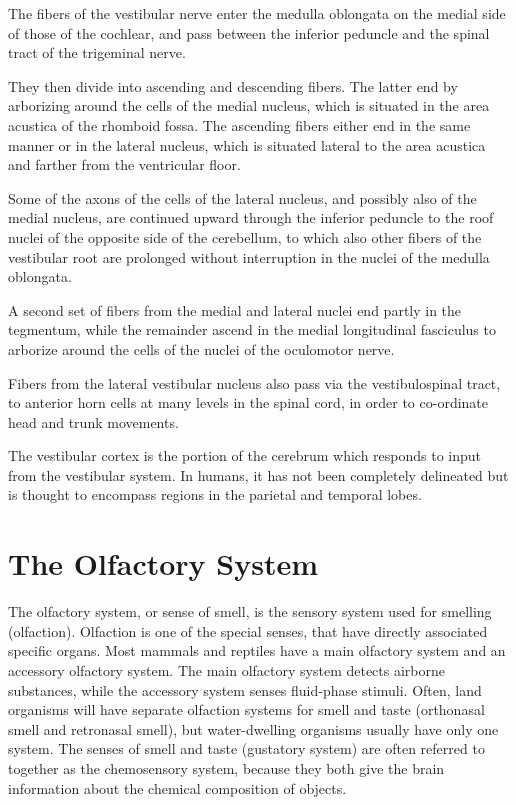 The fibers of the vestibular nerve enter the medulla oblongata on the medial side of those of the cochlear, and pass between the inferior peduncle and the spinal tract of the trigeminal nerve.

They then divide into ascending and descending fibers. The latter end by arborizing around the cells of the medial nucleus, which is situated in the area acustica of the rhomboid fossa. The ascending fibers either end in the same manner or in the lateral nucleus, which is situated lateral to the area acustica and farther from the ventricular floor.

Some of the axons of the cells of the lateral nucleus, and possibly also of the medial nucleus, are continued upward through the inferior peduncle to the roof nuclei of the opposite side of the cerebellum, to which also other fibers of the vestibular root are prolonged without interruption in the nuclei of the medulla oblongata.

A second set of fibers from the medial and lateral nuclei end partly in the tegmentum, while the remainder ascend in the medial longitudinal fasciculus to arborize around the cells of the nuclei of the oculomotor nerve.

Fibers from the lateral vestibular nucleus also pass via the vestibulospinal tract, to anterior horn cells at many levels in the spinal cord, in order to co-ordinate head and trunk movements.

The vestibular cortex is the portion of the cerebrum which responds to input from the vestibular system. In humans, it has not been completely delineated but is thought to encompass regions in the parietal and temporal lobes.

\hypertarget{the-olfactory-system}{%
\chapter{The Olfactory System}\label{the-olfactory-system}}

The olfactory system, or sense of smell, is the sensory system used for smelling (olfaction). Olfaction is one of the special senses, that have directly associated specific organs. Most mammals and reptiles have a main olfactory system and an accessory olfactory system. The main olfactory system detects airborne substances, while the accessory system senses fluid-phase stimuli. Often, land organisms will have separate olfaction systems for smell and taste (orthonasal smell and retronasal smell), but water-dwelling organisms usually have only one system. The senses of smell and taste (gustatory system) are often referred to together as the chemosensory system, because they both give the brain information about the chemical composition of objects.

